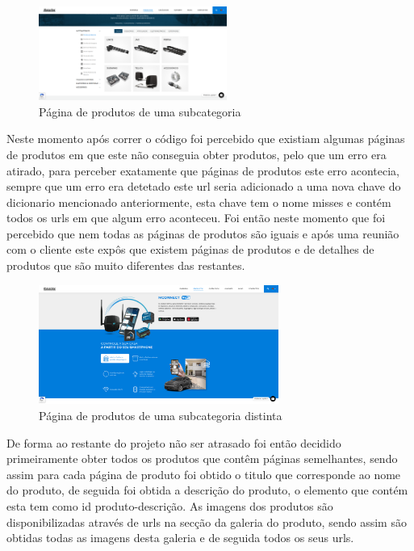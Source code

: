 \begin{figure}[htb]
    \centering
    
    \includegraphics[width=0.55\textwidth]{images/implementacao/scraper/pagina_produtos_subcat.png}
    \caption{Página de produtos de uma subcategoria}
    \label{fig:51}
\end{figure}

\newpage
Neste momento após correr o código foi percebido que existiam algumas páginas de produtos em que este não conseguia obter produtos,
pelo que um erro era atirado, para perceber exatamente que páginas de produtos este erro acontecia, sempre que um erro era detetado
este url seria adicionado a uma nova chave do dicionario mencionado anteriormente, esta chave tem o nome misses e contém todos os urls
em que algum erro aconteceu. Foi então neste momento que foi percebido que nem todas as páginas de produtos são iguais e após uma
reunião com o cliente este expôs que existem páginas de produtos e de detalhes de produtos que são muito diferentes das restantes.

\begin{figure}[htb]
    \centering
    
    \includegraphics[width=0.7\textwidth]{images/implementacao/scraper/pagina_mconnect.png}
    \caption{Página de produtos de uma subcategoria distinta}
    \label{fig:52}
\end{figure}

De forma ao restante do projeto não ser atrasado foi então decidido primeiramente obter todos os produtos que contêm páginas semelhantes,
sendo assim para cada página de produto foi obtido o titulo que corresponde ao nome do produto, de seguida foi obtida a descrição do produto,
o elemento que contém esta tem como id produto-descrição. As imagens dos produtos são disponibilizadas através de urls na secção da galeria do produto, sendo assim são obtidas todas as imagens desta
galeria e de seguida todos os seus urls.

